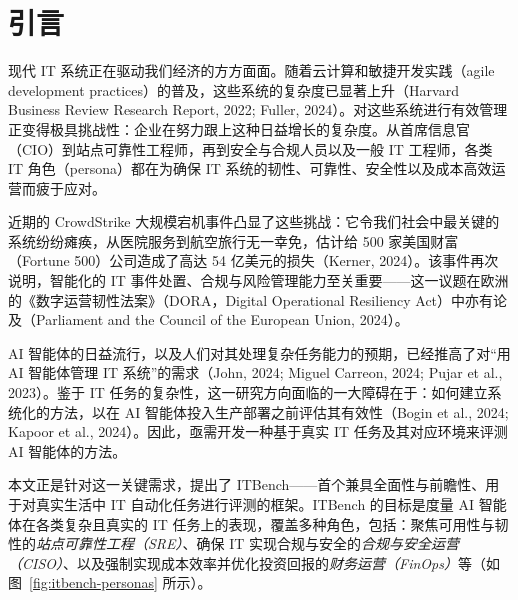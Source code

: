 \begin{abstract}
要实现“用 AI 智能体（agent）自动完成关键 IT 任务”这一愿景，离不开对所提出方案有效性的度量与理解能力。我们提出 ITBench，一个用于对 AI 智能体进行评测（benchmark）、使其能够应对真实世界 IT 自动化任务的框架，并为此提供一套系统化的方法论。我们的首个发布版本聚焦于三个关键领域：站点可靠性工程（SRE，Site Reliability Engineering）、合规与安全运营（CISO，Compliance and Security Operations）以及财务运营（FinOps，Financial Operations）。该框架的设计使 AI 研究者能够借助一键式（push-button）工作流和可解释的指标，理解 AI 智能体在 IT 自动化中所面临的挑战与机遇。ITBench 包含一组初始的 94 个真实世界场景（scenario），并可通过社区贡献轻松扩展。我们的实验结果表明：由当前最先进（state-of-the-art）模型驱动的智能体仅能解决 13.8\% 的 SRE 场景、25.2\% 的 CISO 场景以及 0\% 的 FinOps 场景。我们期望 ITBench 能成为推动 AI 驱动的 IT 自动化迈向正确、安全、快速的关键使能力量。
\end{abstract}

\section{引言}

现代 IT 系统正在驱动我们经济的方方面面。随着云计算和敏捷开发实践（agile development practices）的普及，这些系统的复杂度已显著上升（Harvard Business Review Research Report, 2022; Fuller, 2024）。对这些系统进行有效管理正变得极具挑战性：企业在努力跟上这种日益增长的复杂度。从首席信息官（CIO）到站点可靠性工程师，再到安全与合规人员以及一般 IT 工程师，各类 IT 角色（persona）都在为确保 IT 系统的韧性、可靠性、安全性以及成本高效运营而疲于应对。

近期的 CrowdStrike 大规模宕机事件凸显了这些挑战：它令我们社会中最关键的系统纷纷瘫痪，从医院服务到航空旅行无一幸免，估计给 500 家美国财富（Fortune 500）公司造成了高达 54 亿美元的损失（Kerner, 2024）。该事件再次说明，智能化的 IT 事件处置、合规与风险管理能力至关重要——这一议题在欧洲的《数字运营韧性法案》（DORA，Digital Operational Resiliency Act）中亦有论及（Parliament and the Council of the European Union, 2024）。

AI 智能体的日益流行，以及人们对其处理复杂任务能力的预期，已经推高了对“用 AI 智能体管理 IT 系统”的需求（John, 2024; Miguel Carreon, 2024; Pujar et al., 2023）。鉴于 IT 任务的复杂性，这一研究方向面临的一大障碍在于：如何建立系统化的方法，以在 AI 智能体投入生产部署之前评估其有效性（Bogin et al., 2024; Kapoor et al., 2024）。因此，亟需开发一种基于真实 IT 任务及其对应环境来评测 AI 智能体的方法。

本文正是针对这一关键需求，提出了 ITBench——首个兼具全面性与前瞻性、用于对真实生活中 IT 自动化任务进行评测的框架。ITBench 的目标是度量 AI 智能体在各类复杂且真实的 IT 任务上的表现，覆盖多种角色，包括：聚焦可用性与韧性的\emph{站点可靠性工程（SRE）}、确保 IT 实现合规与安全的\emph{合规与安全运营（CISO）}、以及强制实现成本效率并优化投资回报的\emph{财务运营（FinOps）}等（如图~\ref{fig:itbench-personas} 所示）。

